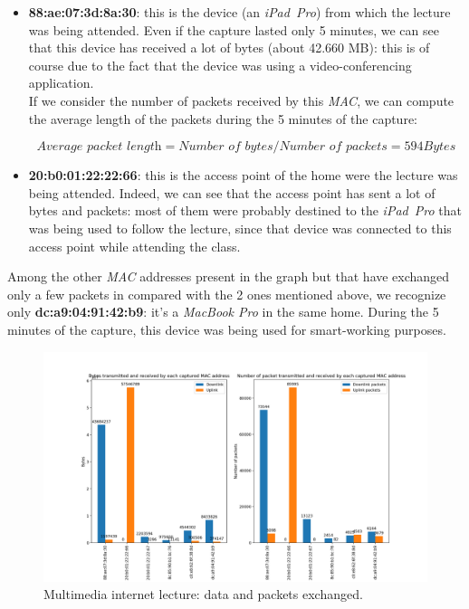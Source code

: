 \begin{itemize}
    \item \textbf{88:ae:07:3d:8a:30}: this is the device (an \textit{iPad\ Pro}) from which the lecture 
            was being attended. Even if the capture lasted only 5 minutes, we can see that this 
            device has received a lot of bytes (about 42.660 MB): this is of course due to the fact
            that the device was using a video-conferencing application.\\ 
            If we consider the number of packets received by this \textit{MAC}, we can compute the 
            average length of the packets during the 5 minutes of the capture:

            \begin{equation}
                \textit{Average packet length} = \textit{Number of bytes} / \textit{Number of packets} = 594 Bytes
            \end{equation}

    \item \textbf{20:b0:01:22:22:66}: this is the access point of the home were the lecture was being
            attended. Indeed, we can see that the access point has sent a lot of bytes and packets: 
            most of them were probably destined to the \textit{iPad\ Pro} that was being used to
            follow the lecture, since that device was connected to this access point while attending 
            the class. 
\end{itemize}

Among the other \textit{MAC} addresses present in the graph but that have exchanged only a few 
packets in compared with the 2 ones mentioned above, we recognize only \textbf{dc:a9:04:91:42:b9}: 
it's a \textit{MacBook Pro} in the same home. During the 5 minutes of the capture, this device was 
being used for smart-working purposes.

\begin{figure}[h]
    \centering
    \includegraphics[width=\linewidth]{Graphs/Multimedia_internet_bytes_packets.png}
    \caption{Multimedia internet lecture: data and packets exchanged.}
    \label{fig:Multimedia internet lecture: data and packets exchanged.}
\end{figure}


